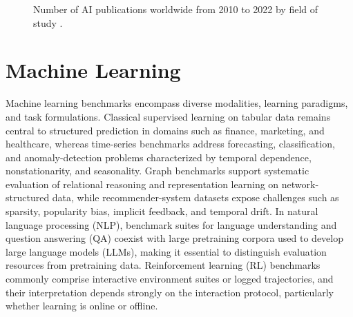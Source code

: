\documentclass{article}
\newcounter{entry}[section]
\begin{document}
\begin{figure}[tbp]

    \caption{Number of AI publications worldwide from 2010 to 2022 by field of study \cite[p. 33]{maslej2024aiindex}.}
    \label{figure:AI_publications_by_field}
\end{figure}




\clearpage




\section{Machine Learning}

Machine learning benchmarks encompass diverse modalities, learning paradigms, and task formulations. Classical supervised learning on tabular data remains central to structured prediction in domains such as finance, marketing, and healthcare, whereas time-series benchmarks address forecasting, classification, and anomaly-detection problems characterized by temporal dependence, nonstationarity, and seasonality. Graph benchmarks support systematic evaluation of relational reasoning and representation learning on network-structured data, while recommender-system datasets expose challenges such as sparsity, popularity bias, implicit feedback, and temporal drift. In natural language processing (NLP), benchmark suites for language understanding and question answering (QA) coexist with large pretraining corpora used to develop large language models (LLMs), making it essential to distinguish evaluation resources from pretraining data. Reinforcement learning (RL) benchmarks commonly comprise interactive environment suites or logged trajectories, and their interpretation depends strongly on the interaction protocol, particularly whether learning is online or offline.
\end{document}
